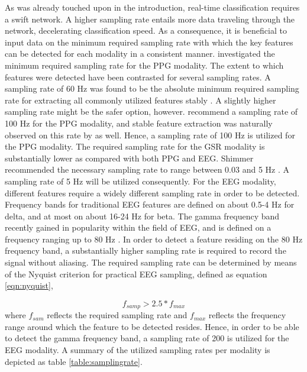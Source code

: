 \documentclass[12pt]{article}
\begin{document}
As was already touched upon in the introduction, real-time classification requires a swift network. A higher sampling rate entails more data traveling through the network, decelerating classification speed. As a consequence, it is beneficial to input data on the minimum required sampling rate with which the key features can be detected for each modality in a consistent manner.  investigated the minimum required sampling rate for the PPG modality. The extent to which features were detected have been contrasted for several sampling rates. A sampling rate of 60 Hz was found to be the absolute minimum required sampling rate for extracting all commonly utilized features stably \cite{fujita2019evaluation}. A slightly higher sampling rate might be the safer option, however.  recommend a sampling rate of 100 Hz for the PPG modality, and stable feature extraction was naturally observed on this rate by  as well. Hence, a sampling rate of 100 Hz is utilized for the PPG modality. The required sampling rate for the GSR modality is substantially lower as compared with both PPG and EEG. Shimmer recommended the necessary sampling rate to range between 0.03 and 5 Hz \cite{shimmer}. A sampling rate of 5 Hz will be utilized consequently. For the EEG modality, different features require a widely different sampling rate in order to be detected. Frequency bands for traditional EEG features are defined on about 0.5-4 Hz for delta, and at most on about 16-24 Hz for beta. The gamma frequency band recently gained in popularity within the field of EEG, and is defined on a frequency ranging up to 80 Hz \cite{weiergraeber2016sampling}. In order to detect a feature residing on the 80 Hz frequency band, a substantially higher sampling rate is required to record the signal without aliasing. The required sampling rate can be determined by means of the Nyquist criterion for practical EEG sampling, defined as equation \ref{eqn:nyquist},

\begin{equation}
\label{eqn:nyquist}
f_{samp} > 2.5 * f_{max}
\end{equation}
where $f_{sam}$ reflects the required sampling rate and $f_{max}$ reflects the frequency range around which the feature to be detected resides\cite{srinivasan1998estimating}. Hence, in order to be able to detect the gamma frequency band, a sampling rate of 200 is utilized for the EEG modality. A summary of the utilized sampling rates per modality is depicted as table \ref{table:samplingrate}.
\end{document}
